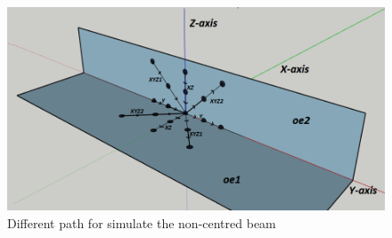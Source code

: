 \begin{figure}[]
%
\centering
%
\includegraphics[width=1.\textwidth]{Immagini/Chapter4/Cattura2}
%
\caption{Different path for simulate the non-centred beam}
%
\label{fig: path}
%
\end{figure}

